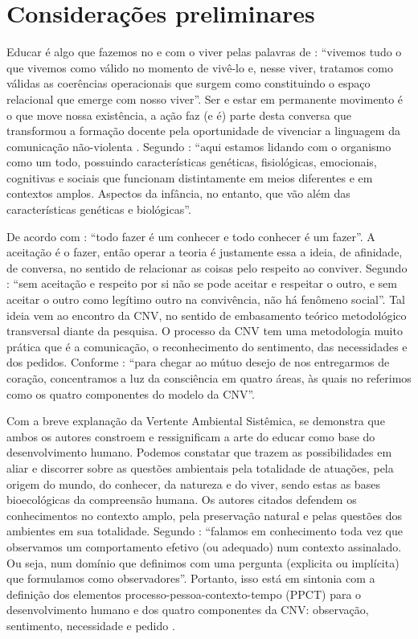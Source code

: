 \documentclass{textolivre-html}
\begin{document}
\section{Considerações preliminares}\label{sec-consideracoes}
Educar é algo que fazemos no e com o viver pelas palavras de \textcite[p. 185]{maturana2009}: “vivemos tudo o que vivemos como válido no momento de vivê-lo e, nesse viver, tratamos como válidas as coerências operacionais que surgem como constituindo o espaço relacional que emerge com nosso viver”. Ser e estar em permanente movimento é o que move nossa existência, a ação faz (e é) parte desta conversa que transformou a formação docente pela oportunidade de vivenciar a linguagem da comunicação não-violenta \cite{rosenberg2006}. Segundo \textcite[p. 96]{brofen2011}: ``aqui estamos lidando com o organismo como um todo, possuindo características genéticas, fisiológicas, emocionais, cognitivas e sociais que funcionam distintamente em meios diferentes e em contextos amplos. Aspectos da infância, no entanto, que vão além das características genéticas e biológicas''.

De acordo com \textcite[p. 32]{maturana2011}: “todo fazer é um conhecer e todo conhecer é um fazer”. A aceitação é o fazer, então operar a teoria é justamente essa a ideia, de afinidade, de conversa, no sentido de relacionar as coisas pelo respeito ao conviver. Segundo \textcite[p. 31]{maturana1998}: “sem aceitação e respeito por si não se pode aceitar e respeitar o outro, e sem aceitar o outro como legítimo outro na convivência, não há fenômeno social”. Tal ideia vem ao encontro da CNV, no sentido de embasamento teórico metodológico transversal diante da pesquisa. O processo da CNV tem uma metodologia muito prática que é a comunicação, o reconhecimento do sentimento, das necessidades e dos pedidos. Conforme \textcite[p. 25]{rosenberg2006}: “para chegar ao mútuo desejo de nos entregarmos de coração, concentramos a luz da consciência em quatro áreas, às quais no referimos como os quatro componentes do modelo da CNV”.

Com a breve explanação da Vertente Ambiental Sistêmica, se demonstra que ambos os autores constroem e ressignificam a arte do educar como base do desenvolvimento humano. Podemos constatar que \textcite{maturana2011,brofen2011,rosenberg2006} trazem as possibilidades em aliar e discorrer sobre as questões ambientais pela totalidade de atuações, pela origem do mundo, do conhecer, da natureza e do viver, sendo estas as bases bioecológicas da compreensão humana. Os autores citados defendem os conhecimentos no contexto amplo, pela preservação natural e pelas questões dos ambientes em sua totalidade. Segundo \textcite[p. 195]{maturana2011}: “falamos em conhecimento toda vez que observamos um comportamento efetivo (ou adequado) num contexto assinalado. Ou seja, num domínio que definimos com uma pergunta (explicita ou implícita) que formulamos como observadores”. Portanto, isso está em sintonia com a definição dos elementos processo-pessoa-contexto-tempo (PPCT) para o desenvolvimento humano \cite{brofen2011} e dos quatro componentes da CNV: observação, sentimento, necessidade e pedido \cite{rosenberg2006}. 
\end{document}
